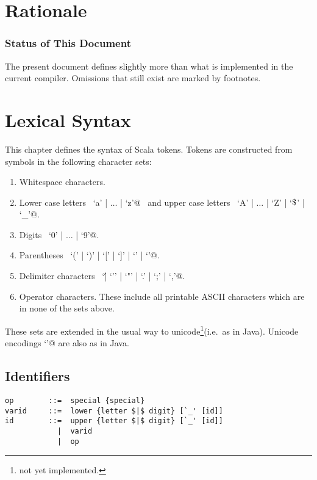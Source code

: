 \documentclass[a4paper,12pt,twoside,titlepage]{book}
\renewcommand{\todo}[1]{{$\clubsuit$\bf todo: #1$\spadesuit$}}
\newcommand{\notyet}{\footnote{not yet implemented.}}
\begin{document}
\frontmatter
\makedoctitle
\clearemptydoublepage
\tableofcontents
\mainmatter
\sloppy



\chapter{Rationale}



\subsection*{Status of This Document}

The present document defines slightly more than what is implemented in
the current compiler. Omissions that still exist are marked by footnotes.

\chapter{Lexical Syntax}

This chapter defines the syntax of Scala tokens. Tokens are
constructed from symbols in the following character sets:
\begin{enumerate}
\item Whitespace characters.
\item Lower case letters ~\lstinline@`a' | $\ldots$ | `z'@~  and
upper case letters ~\lstinline@`A' | $\ldots$ | `Z' | `$\mbox{\$}$' | `_'@.
\item Digits ~\lstinline@`0' | $\ldots$ | `9'@.
\item Parentheses ~\lstinline@`(' | `)' | `[' | `]' | `{' | `}'@.
\item Delimiter characters ~\lstinline@`\' | `'' | `"' | `.' | `;' | `,'@.
\item Operator characters. These include all printable ASCII characters
which are in none of the sets above.
\end{enumerate}

These sets are extended in the usual way to unicode\notyet (i.e.\ as in Java).
Unicode encodings \lstinline@`\uXXXX'@ are also as in Java.

\section{Identifiers}

\syntax\begin{lstlisting}
op        ::=  special {special}
varid     ::=  lower {letter $|$ digit} [`_' [id]]
id        ::=  upper {letter $|$ digit} [`_' [id]]
            |  varid
            |  op
\end{lstlisting}
\end{document}
